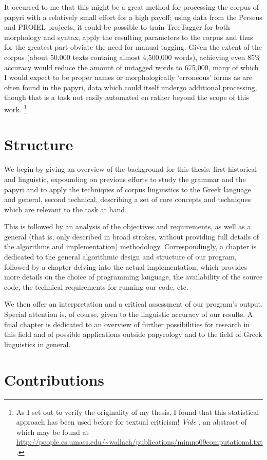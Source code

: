 It occurred to me that this might be a great method for processing the
corpus of papyri with a relatively small effort for a high payoff;
using data from the Perseus and PROIEL projects, it could be possible
to train TreeTagger for both morphology and syntax, apply the
resulting parameters to the corpus and thus for the greatest part
obviate the need for manual tagging.  Given the extent of the corpus
(about 50,000 texts containg almost 4,500,000 words), achieving even
85\% accuracy would reduce the amount of untagged words to 675,000,
many of which I would expect to be proper names or morphologically
`erroneous' forms as are often found in the papyri, data which could
itself undergo additional processing, though that is a task not easily
automated en rather beyond the scope of this work.  \footnote{As I set
out to verify the originality of my thesis, I found that this
statistical approach has been used before for textual criticism!
\textit{Vide} \citet{mimno2009}, an abstract of which may be found at
\url{http://people.cs.umass.edu/~wallach/publications/mimno09computational.txt}.}
\section{Structure}

We begin by giving an overview of the background for this thesis:
first historical and linguistic, expounding on previous efforts to
study the grammar and the papyri and to apply the techniques of corpus
linguistics to the Greek language and general, second technical,
describing a set of core concepts and techniques which are relevant to
the task at hand.

This is followed by an analysis of the objectives and requirements, as
well as a general (that is, only described in broad strokes, without
providing full details of the algorithms and implementation)
methodology. Correspondingly, a chapter is dedicated to the general
algorithmic design and structure of our program, followed by a chapter
delving into the actual implementation, which provides more details on
the choice of programming language, the availability of the source
code, the technical requirements for running our code, etc.

We then offer an interpretation and a critical assessment of our
program's output. Special attention is, of course, given to the
linguistic accuracy of our results. A final chapter is dedicated to an
overview of further possibilities for research in this field and of
possible applications outside papyrology and to the field of Greek
linguistics in general.

\section{Contributions}

